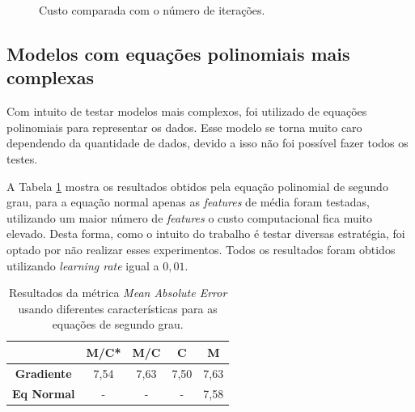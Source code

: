 \documentclass[conference]{IEEEtran}
\begin{document}
\begin{figure}[!h]
	\centering
	{
		{
			\setlength{\fboxsep}{1pt}
			\setlength{\fboxrule}{1pt}
		}
	}
	\caption{Custo comparada com o número de iterações.}
	\label{fig:learningrate}
\end{figure}


\subsection{Modelos com equações polinomiais mais complexas}

Com intuito de testar modelos mais complexos, foi utilizado de equações polinomiais para representar os dados. Esse modelo se torna muito caro dependendo da quantidade de dados, devido a isso não foi possível fazer todos os testes.

A Tabela \ref{tab:comp} mostra os resultados obtidos pela equação polinomial de segundo grau, para a equação normal apenas as \emph{features} de média foram testadas, utilizando um maior número de \emph{features} o custo computacional fica muito elevado. Desta forma, como o intuito do trabalho é testar diversas estratégia, foi optado por não realizar esses experimentos. Todos os resultados foram obtidos utilizando \emph{learning rate} igual a $0,01$.

\begin{table}[!h]
	\centering

	\begin{tabular}{ccccc} \\ \hline
		\backslashbox{\textbf{Modelos}}{\textbf{Features}} & \textbf{M/C*} & \textbf{M/C} & \textbf{C} & \textbf{M} \\ \hline
		\textbf{Gradiente}      & 7,54     & 7,63         & 7,50       & 7,63  \\
		\textbf{Eq Normal}      & -       & -         & -       & 7,58    \\ \hline
	\end{tabular}
	\caption{Resultados da métrica \textit{Mean Absolute Error} usando diferentes características para as equações de segundo grau.}
	\label{tab:comp}
\end{table}
\end{document}
